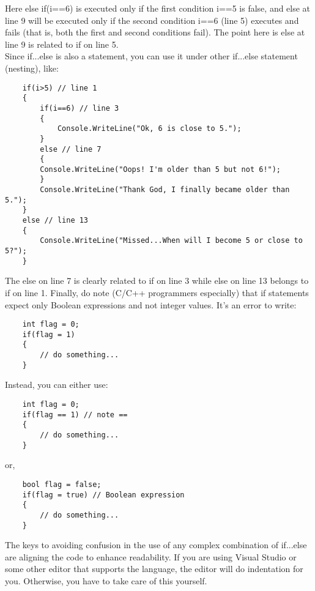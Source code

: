 Here else if(i==6) is executed only if the first condition i==5 is false, and else at line 9 will be executed only if the
second condition i==6 (line 5) executes and fails (that is, both the first and second conditions fail). The point here
is else at line 9 is related to if on line 5.\\

Since if...else is also a statement, you can use it under other if...else statement (nesting), like:

\begin{lstlisting}
    if(i>5) // line 1
    {
        if(i==6) // line 3
        {
            Console.WriteLine("Ok, 6 is close to 5.");
        }
        else // line 7
        {
        Console.WriteLine("Oops! I'm older than 5 but not 6!");
        }
        Console.WriteLine("Thank God, I finally became older than 5.");
    }
    else // line 13
    {
        Console.WriteLine("Missed...When will I become 5 or close to 5?");
    }
\end{lstlisting}

The else on line 7 is clearly related to if on line 3 while else on line 13 belongs to if on line 1. Finally, do note
(C/C++ programmers especially) that if statements expect only Boolean expressions and not integer values. It’s an
error to write:

\begin{lstlisting}
    int flag = 0;
    if(flag = 1)
    {
        // do something...
    }
\end{lstlisting}

Instead, you can either use:

\begin{lstlisting}
    int flag = 0;
    if(flag == 1) // note ==
    {
        // do something...
    }
\end{lstlisting}

or,

\begin{lstlisting}
    bool flag = false;
    if(flag = true) // Boolean expression
    {
        // do something...
    }
\end{lstlisting}

The keys to avoiding confusion in the use of any complex combination of if...else are aligning the code to enhance readability. If you are using Visual Studio or some other
editor that supports the language, the editor will do indentation for you. Otherwise, you have to take care of this
yourself.\\

